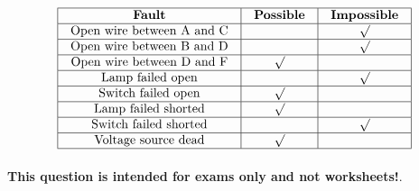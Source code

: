 

$$\vbox{\offinterlineskip
\halign{\strut
\vrule \quad\hfil # \ \hfil & 
\vrule \quad\hfil # \ \hfil & 
\vrule \quad\hfil # \ \hfil \vrule \cr
\noalign{\hrule}
%
{\bf Fault} & {\bf Possible} & {\bf Impossible} \cr
%
\noalign{\hrule}
%
Open wire between A and C &  & $\surd$ \cr
%
\noalign{\hrule}
%
Open wire between B and D &  & $\surd$ \cr
%
\noalign{\hrule}
%
Open wire between D and F & $\surd$ &  \cr
%
\noalign{\hrule}
%
Lamp failed open &  & $\surd$ \cr
%
\noalign{\hrule}
%
Switch failed open & $\surd$ &  \cr
%
\noalign{\hrule}
%
Lamp failed shorted & $\surd$ &  \cr
%
\noalign{\hrule}
%
Switch failed shorted &  & $\surd$ \cr
%
\noalign{\hrule}
%
Voltage source dead & $\surd$ &  \cr
%
\noalign{\hrule}
} %
}$$ %








{\bf This question is intended for exams only and not worksheets!}.


